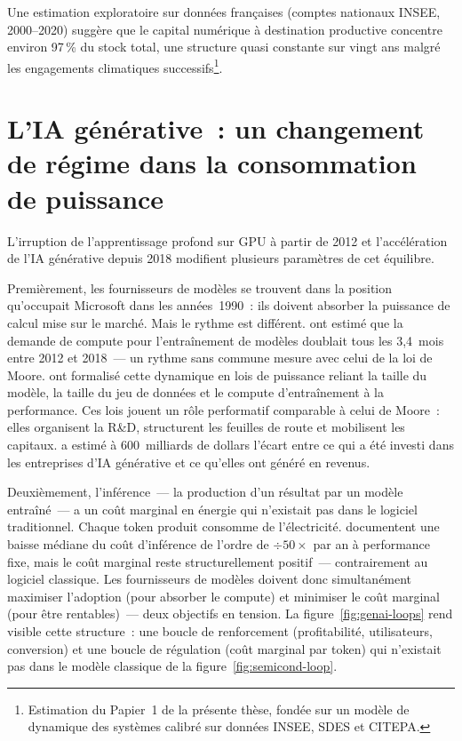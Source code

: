 Une estimation exploratoire sur données françaises (comptes nationaux INSEE, 2000--2020) suggère que le capital numérique à destination productive concentre environ 97\,\% du stock total, une structure quasi constante sur vingt ans malgré les engagements climatiques successifs\footnote{Estimation du Papier~1 de la présente thèse, fondée sur un modèle de dynamique des systèmes calibré sur données INSEE, SDES et CITEPA.}.

\section{L'IA générative~: un changement de régime dans la consommation de puissance}

L'irruption de l'apprentissage profond sur GPU à partir de 2012 \parencite{krizhevsky_imagenet_2012} et l'accélération de l'IA générative depuis 2018 modifient plusieurs paramètres de cet équilibre.

Premièrement, les fournisseurs de modèles se trouvent dans la position qu'occupait Microsoft dans les années~1990~: ils doivent absorber la puissance de calcul mise sur le marché. Mais le rythme est différent. \textcite{openai_ai_2018} ont estimé que la demande de compute pour l'entraînement de modèles doublait tous les 3,4~mois entre 2012 et 2018~--- un rythme sans commune mesure avec celui de la loi de Moore. \textcite{kaplan_scaling_2020} ont formalisé cette dynamique en lois de puissance reliant la taille du modèle, la taille du jeu de données et le compute d'entraînement à la performance. Ces lois jouent un rôle performatif comparable à celui de Moore~: elles organisent la R\&D, structurent les feuilles de route et mobilisent les capitaux. \textcite{cahn_question_2024} a estimé à 600~milliards de dollars l'écart entre ce qui a été investi dans les entreprises d'IA générative et ce qu'elles ont généré en revenus.

Deuxièmement, l'inférence~--- la production d'un résultat par un modèle entraîné~--- a un coût marginal en énergie qui n'existait pas dans le logiciel traditionnel. Chaque token produit consomme de l'électricité. \textcite{cottier_rapid_2025} documentent une baisse médiane du coût d'inférence de l'ordre de $\div 50\times$ par an à performance fixe, mais le coût marginal reste structurellement positif~--- contrairement au logiciel classique. Les fournisseurs de modèles doivent donc simultanément maximiser l'adoption (pour absorber le compute) et minimiser le coût marginal (pour être rentables)~--- deux objectifs en tension. La figure~\ref{fig:genai-loops} rend visible cette structure~: une boucle de renforcement (profitabilité, utilisateurs, conversion) et une boucle de régulation (coût marginal par token) qui n'existait pas dans le modèle classique de la figure~\ref{fig:semicond-loop}.

